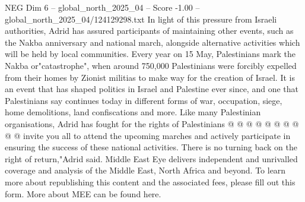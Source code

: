\begin{textsample}{NEG Dim 6 – global\_north\_2025\_04 – Score -1.00 – global\_north\_2025\_04/124129298.txt}
In light of this pressure from Israeli authorities, Adrid has assured participants of maintaining other events, such as the Nakba anniversary and national march, alongside alternative activities which will be held by local communities.
Every year on 15 May, Palestinians mark the Nakba or"catastrophe", when around 750,000 Palestinians were forcibly expelled from their homes by Zionist militias to make way for the creation of Israel.
It is an event that has shaped politics in Israel and Palestine ever since, and one that Palestinians say continues today in different forms of war, occupation, siege, home demolitions, land confiscations and more.
Like many Palestinian organisations, Adrid has fought for the rights of Palestinians @ @ @ @ @ @ @ @ @ @ invite you all to attend the upcoming marches and actively participate in ensuring the success of these national activities.
There is no turning back on the right of return,"Adrid said.
Middle East Eye delivers independent and unrivalled coverage and analysis of the Middle East, North Africa and beyond.
To learn more about republishing this content and the associated fees, please fill out this form.
More about MEE can be found here.

\end{textsample}
